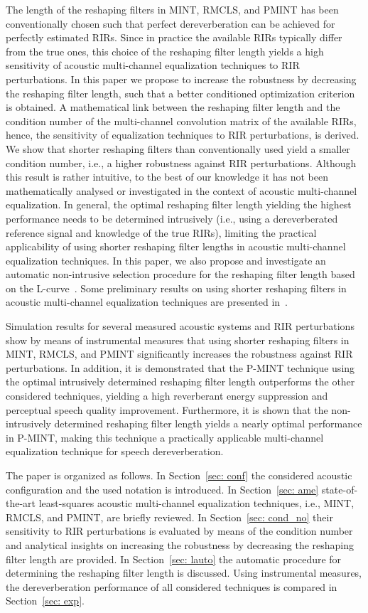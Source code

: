 \documentclass[twocolumn]{bmcart}%
\begin{document}
The length of the reshaping filters in MINT, RMCLS, and PMINT has been conventionally chosen such that perfect dereverberation can be achieved for perfectly estimated RIRs.
Since in practice the available RIRs typically differ from the true ones, this choice of the reshaping filter length yields a high sensitivity of acoustic multi-channel equalization techniques to RIR perturbations.
In this paper we propose to increase the robustness by decreasing the reshaping filter length, such that a better conditioned optimization criterion is obtained.
A mathematical link between the reshaping filter length and the condition number of the multi-channel convolution matrix of the available RIRs, hence, the sensitivity of equalization techniques to RIR perturbations, is derived. 
We show that shorter reshaping filters than conventionally used yield a smaller condition number, i.e., a higher robustness against RIR perturbations.
Although this result is rather intuitive, to the best of our knowledge it has not been mathematically analysed or investigated in the context of acoustic multi-channel equalization.
In general, the optimal reshaping filter length yielding the highest performance needs to be determined intrusively (i.e., using a dereverberated reference signal and knowledge of the true RIRs), limiting the practical applicability of using shorter reshaping filter lengths in acoustic multi-channel equalization techniques.
In this paper, we also propose and investigate an automatic non-intrusive selection procedure for the reshaping filter length based on the L-curve~\cite{Castellanos_2002}.
Some preliminary results on using shorter reshaping filters in acoustic multi-channel equalization techniques are presented in~\cite{Kodrasi_EUSIPCO_2012}.

Simulation results for several measured acoustic systems and RIR perturbations show by means of instrumental measures that using shorter reshaping filters in MINT, RMCLS, and PMINT significantly increases the robustness against RIR perturbations.
In addition, it is demonstrated that the P-MINT technique using the optimal intrusively determined reshaping filter length outperforms the other considered techniques, yielding a high reverberant energy suppression and perceptual speech quality improvement.
Furthermore, it is shown that the non-intrusively determined reshaping filter length yields a nearly optimal performance in P-MINT, making this technique a practically applicable multi-channel equalization technique for speech dereverberation.

The paper is organized as follows.
In Section~\ref{sec: conf} the considered acoustic configuration and the used notation is introduced.
In Section~\ref{sec: ame} state-of-the-art least-squares acoustic multi-channel equalization techniques, i.e., MINT, RMCLS, and PMINT, are briefly reviewed.
In Section~\ref{sec: cond_no} their sensitivity to RIR perturbations is evaluated by means of the condition number and analytical insights on increasing the robustness by decreasing the reshaping filter length are provided.
In Section~\ref{sec: lauto} the automatic procedure for determining the reshaping filter length is discussed.
Using instrumental measures, the dereverberation performance of all considered techniques is compared in Section~\ref{sec: exp}.
\end{document}
